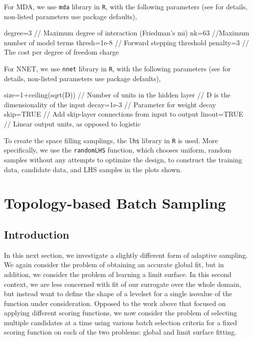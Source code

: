 For MDA, we use \texttt{mda} library in \texttt{R}, with the following parameters (see \cite{mda} for details, non-listed parameters use package defaults),
\begin{code}
degree=3 // Maximum degree of interaction (Friedman's mi)
nk=63  //Maximum number of model terms
thresh=1e-8 // Forward stepping threshold
penalty=3 // The cost per degree of freedom charge
\end{code}

For NNET, we use \texttt{nnet} library in \texttt{R}, with the following parameters (see \cite{nnet} for details, non-listed parameters use package defaults),
\begin{code}
size=1+ceiling(sqrt(D)) // Number of units in the hidden layer
                        // D is the dimensionality of the input
decay=1e-3 // Parameter for weight decay
skip=TRUE // Add skip-layer connections from input to output
linout=TRUE // Linear output units, as opposed to logistic
\end{code}

To create the space filling samplings, the \texttt{lhs} library in \texttt{R} \cite{lhs} is used.
%
More specifically, we use the \texttt{randomLHS} function, which chooses uniform, random samples without any attempts to optimize the design, to construct the training data, candidate data, and LHS samples in the plots shown.


\section{Topology-based Batch Sampling}
\label{paper:batch}

\subsection{Introduction}

In this next section, we investigate a slightly different form of adaptive sampling.
%
We again  consider the problem of obtaining an accurate global fit, but in addition, we consider the problem of learning a limit surface.
%
In this second context, we are less concerned with fit of our surrogate over the whole domain, but instead want to define the shape of a levelset for a single isovalue of the function under consideration.
%
Opposed to the work above that focused on applying different scoring functions, we now consider the problem of selecting multiple candidates at a time using various batch selection criteria for a fixed scoring function on each of the two problems: global and limit surface fitting.

